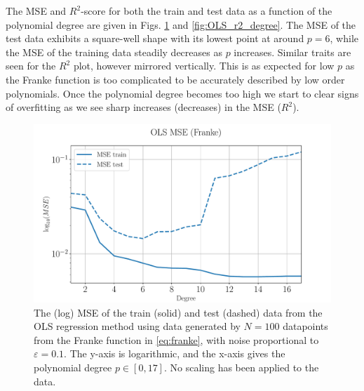 \documentclass[%
reprint,
amsmath,amssymb,
aps,
pra,
]{revtex4-2}
\begin{document}
The MSE and $R^2$-score for both the train and test data as a function of the polynomial degree are given in Figs. \ref{fig:OLS_mse_degree} and \ref{fig:OLS_r2_degree}. The MSE of the test data exhibits a square-well shape with its lowest point at around \(p=6\), while the MSE of the training data steadily decreases as \(p\) increases. Similar traits are seen for the $R^2$ plot, however mirrored vertically. This is as expected for low $p$ as the Franke function is too complicated to be accurately described by low order polynomials. Once the polynomial degree becomes too high we start to clear signs of overfitting as we see sharp increases (decreases) in the MSE ($R^2$). 
\begin{figure}[ht!]
	\centering
	\includegraphics[width=\linewidth]{Python/Figures/OLS/OLS_MSE_no_scaling.pdf}
	\caption{The (log) MSE of the train (solid) and test (dashed) data from the OLS regression method using data generated by \(N=100\) datapoints from the Franke function in \eqref{eq:franke}, with noise proportional to \(\varepsilon=0.1\). The y-axis is logarithmic, and the x-axis gives the polynomial degree \(p\in[0,17]\). No scaling has been applied to the data.}
	\label{fig:OLS_mse_degree}
\end{figure}
\end{document}
